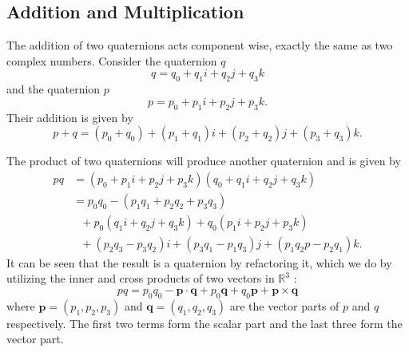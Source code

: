 \subsection{Addition and Multiplication}
The addition of two quaternions acts component wise, exactly the same as two complex numbers.
Consider the quaternion $q$
\begin{equation}
q = q_0 + q_1\textit{i} + q_2\textit{j} + q_3\textit{k}
\label{eq:q}
\end{equation}
and the quaternion $p$
\begin{equation}
p = p_0 + p_1\textit{i} + p_2\textit{j} + p_3\textit{k}.
\label{eq:p}
\end{equation}
Their addition is given by
\begin{equation}
p + q = (p_0+q_0) + (p_1+q_1)\textit{i} + (p_2+q_2)\textit{j} + (p_3+q_3)\textit{k}.
\label{eq:quataddition}
\end{equation}

The product of two quaternions will produce another quaternion and is given by
\begin{align*}
pq &= (p_0 + p_1\textit{i} + p_2\textit{j} + p_3\textit{k})(q_0 + q_1\textit{i} + q_2\textit{j} + q_3\textit{k}) \nonumber \\
&= p_0q_0 - (p_1q_1 + p_2q_2 + p_3q_3) \nonumber \\
&~~~ + p_0(q_1\textit{i} + q_2\textit{j} + q_3\textit{k}) + q_0(p_1\textit{i} + p_2\textit{j} + p_3\textit{k}) \nonumber \\
&~~~ + (p_2q_3 - p_3q_2)\textit{i} + (p_3q_1 - p_1q_3)\textit{j} + (p_1q_2p - p_2q_1)\textit{k}. \nonumber
\end{align*}
It can be seen that the result is a quaternion by refactoring it, which we do by utilizing the inner and cross products of two vectors in $\mathbb{R}^3$ \cite{hungerford1980algebra}:
\begin{equation}
pq = p_0q_0 - \textbf{p}\cdot\textbf{q} + p_0\textbf{q} + q_0\textbf{p} + \textbf{p} \times \textbf{q}
\label{eq:quatmult}
\end{equation}
where $\textbf{p} = (p_1,p_2,p_3)$ and $\textbf{q} = (q_1,q_2,q_3)$ are the vector parts of $p$ and $q$ respectively.
The first two terms form the scalar part and the last three form the vector part.


